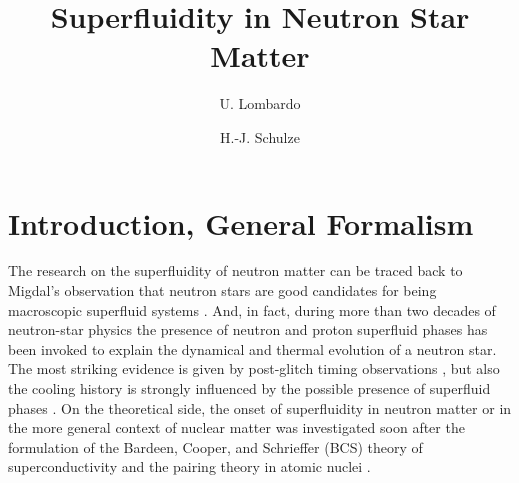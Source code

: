 \documentclass[runningheads]{svmult}
\begin{document}
\title*{Superfluidity in Neutron Star Matter}


\author{U. Lombardo \and H.-J. Schulze}


\maketitle  



\section{Introduction, General Formalism}

The research on the superfluidity of neutron matter can be traced back to 
Migdal's observation that neutron stars are good candidates for being 
macroscopic superfluid systems \cite{MIGD}. 
And, in fact, during more than two decades of 
neutron-star physics the presence of neutron and proton superfluid phases has 
been invoked to explain the dynamical and thermal evolution of a neutron star. 
The most striking evidence is given by post-glitch timing observations 
\cite{SAULS,PINE},
but also the cooling history is strongly influenced by the possible presence
of superfluid phases \cite{TSU,HEI}.
On the theoretical side, the onset of superfluidity in 
neutron matter or in the more general context of nuclear matter was 
investigated soon after the formulation of the 
Bardeen, Cooper, and Schrieffer (BCS) theory of superconductivity \cite{BCS} 
and the pairing theory in atomic nuclei \cite{BMP,BOHR}. 
\end{document}
